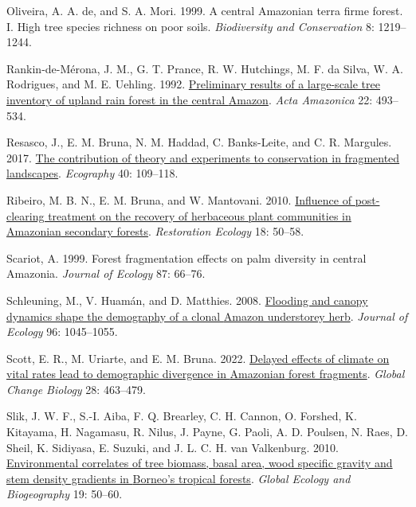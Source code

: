 \documentclass[
  12pt,
  man, donotrepeattitle]{apa6}
\newlength{\cslhangindent}
\newlength{\cslentryspacingunit} %
\newenvironment{CSLReferences}[2] %
 {%
  \setlength{\parindent}{0pt}
  \ifodd #1
  \let\oldpar\par
  \def\par{\hangindent=\cslhangindent\oldpar}
  \fi
  \setlength{\parskip}{#2\cslentryspacingunit}
 }%
 {}
\begin{document}
\begin{CSLReferences}{1}{0}
\leavevmode{}%
Oliveira, A. A. de, and S. A. Mori. 1999. A central {Amazonian} terra firme forest. {I}. {High} tree species richness on poor soils. \emph{Biodiversity and Conservation} 8: 1219--1244.

\leavevmode{}%
Rankin-de-Mérona, J. M., G. T. Prance, R. W. Hutchings, M. F. da Silva, W. A. Rodrigues, and M. E. Uehling. 1992. \href{https://doi.org/10.1590/1809-43921992224534}{Preliminary results of a large-scale tree inventory of upland rain forest in the central {Amazon}}. \emph{Acta Amazonica} 22: 493--534.

\leavevmode{}%
Resasco, J., E. M. Bruna, N. M. Haddad, C. Banks-Leite, and C. R. Margules. 2017. \href{https://doi.org/10.1111/ecog.02546}{The contribution of theory and experiments to conservation in fragmented landscapes}. \emph{Ecography} 40: 109--118.

\leavevmode{}%
Ribeiro, M. B. N., E. M. Bruna, and W. Mantovani. 2010. \href{https://doi.org/10.1111/j.1526-100X.2010.00715.x}{Influence of post-clearing treatment on the recovery of herbaceous plant communities in {Amazonian} secondary forests}. \emph{Restoration Ecology} 18: 50--58.

\leavevmode{}%
Scariot, A. 1999. Forest fragmentation effects on palm diversity in central {Amazonia}. \emph{Journal of Ecology} 87: 66--76.

\leavevmode{}%
Schleuning, M., V. Huamán, and D. Matthies. 2008. \href{https://doi.org/10.1111/j.1365-2745.2008.01416.x}{Flooding and canopy dynamics shape the demography of a clonal {Amazon} understorey herb}. \emph{Journal of Ecology} 96: 1045--1055.

\leavevmode{}%
Scott, E. R., M. Uriarte, and E. M. Bruna. 2022. \href{https://doi.org/10.1111/gcb.15900}{Delayed effects of climate on vital rates lead to demographic divergence in {Amazonian} forest fragments}. \emph{Global Change Biology} 28: 463--479.

\leavevmode{}%
Slik, J. W. F., S.-I. Aiba, F. Q. Brearley, C. H. Cannon, O. Forshed, K. Kitayama, H. Nagamasu, R. Nilus, J. Payne, G. Paoli, A. D. Poulsen, N. Raes, D. Sheil, K. Sidiyasa, E. Suzuki, and J. L. C. H. van Valkenburg. 2010. \href{https://doi.org/10.1111/j.1466-8238.2009.00489.x}{Environmental correlates of tree biomass, basal area, wood specific gravity and stem density gradients in {Borneo}'s tropical forests}. \emph{Global Ecology and Biogeography} 19: 50--60.


\end{CSLReferences}
\end{document}

